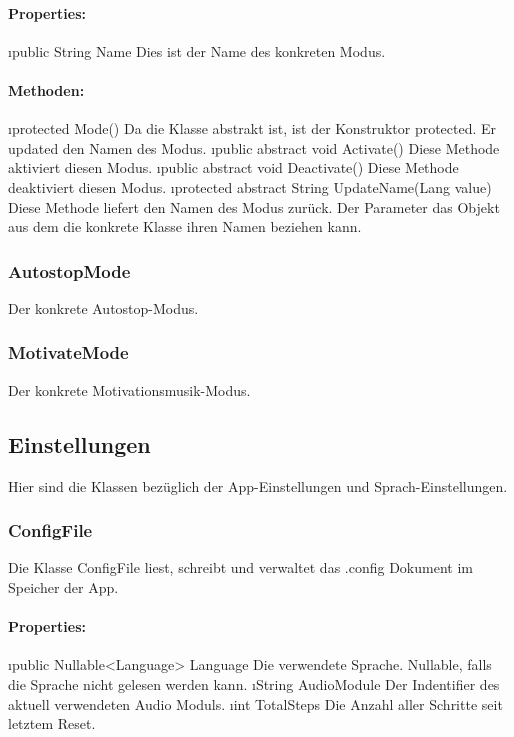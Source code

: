 \documentclass[../entwurf.tex]{subfiles}
\begin{document}
				\paragraph{Properties:}
					\begin{itemize}
						\i{public String Name} Dies ist der Name des konkreten Modus.
					\end{itemize}
				\paragraph{Methoden:}
					\begin{itemize}
						\i{protected Mode()} Da die Klasse abstrakt ist, ist der Konstruktor protected. Er updated den Namen des Modus.
						\i{public abstract void Activate()} Diese Methode aktiviert diesen Modus.
						\i{public abstract void Deactivate()} Diese Methode deaktiviert diesen Modus.
						\i{protected abstract String UpdateName(Lang value)}  Diese Methode liefert den Namen des Modus zurück. Der Parameter das
						Objekt aus dem die konkrete Klasse ihren Namen beziehen kann.
					\end{itemize}
			\subsubsection{AutostopMode}
				Der konkrete Autostop-Modus.
			\subsubsection{MotivateMode}
				Der konkrete Motivationsmusik-Modus.
		\subsection{Einstellungen}
			Hier sind die Klassen bezüglich der App-Einstellungen und Sprach-Einstellungen.
			\subsubsection{ConfigFile}
				Die Klasse ConfigFile liest, schreibt und verwaltet das .config Dokument im Speicher der App.
				\paragraph{Properties:}
					\begin{itemize}
						\i{public Nullable<Language> Language} Die verwendete Sprache. Nullable, falls die Sprache nicht gelesen werden kann.
						\i{String AudioModule} Der Indentifier des aktuell verwendeten Audio Moduls.
						\i{int TotalSteps} Die Anzahl aller Schritte seit letztem Reset.
					\end{itemize}
\end{document}

